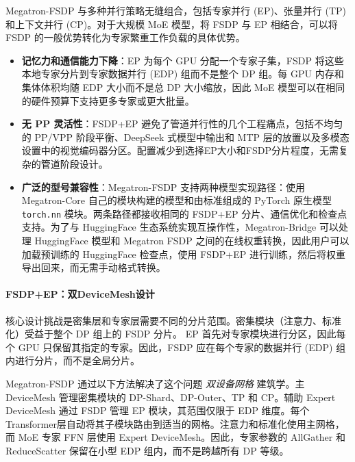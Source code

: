 \documentclass[10pt,logo,copyright]{nvidiatechreport_zh}
\begin{document}
Megatron-FSDP 与多种并行策略无缝组合，包括专家并行 (EP)、张量并行 (TP) 和上下文并行 (CP)。对于大规模 MoE 模型，将 FSDP 与 EP 相结合，可以将 FSDP 的一般优势转化为专家繁重工作负载的具体优势。

\begin{itemize}[itemsep=2pt]
  \item \textbf{记忆力和通信能力下降}：EP 为每个 GPU 分配一个专家子集，FSDP 将这些本地专家分片到专家数据并行 (EDP) 组而不是整个 DP 组。每 GPU 内存和集体体积均随 EDP 大小而不是总 DP 大小缩放，因此 MoE 模型可以在相同的硬件预算下支持更多专家或更大批量。

  \item \textbf{无 PP 灵活性}：FSDP+EP 避免了管道并行性的几个工程痛点，包括不均匀的 PP/VPP 阶段平衡、DeepSeek 式模型中输出和 MTP 层的放置以及多模态设置中的视觉编码器分区。配置减少到选择EP大小和FSDP分片程度，无需复杂的管道阶段设计。

  \item \textbf{广泛的型号兼容性}：Megatron-FSDP 支持两种模型实现路径：使用 Megatron-Core 自己的模块构建的模型和由标准组成的 PyTorch 原生模型 \texttt{torch.nn} 模块。两条路径都接收相同的 FSDP+EP 分片、通信优化和检查点支持。为了与 HuggingFace 生态系统实现互操作性，Megatron-Bridge 可以处理 HuggingFace 模型和 Megatron FSDP 之间的在线权重转换，因此用户可以加载预训练的 HuggingFace 检查点，使用 FSDP+EP 进行训练，然后将权重导出回来，而无需手动格式转换。
\end{itemize}

\paragraph{FSDP+EP：双DeviceMesh设计}

核心设计挑战是密集层和专家层需要不同的分片范围。密集模块（注意力、标准化）受益于整个 DP 组上的 FSDP 分片。 EP 首先对专家模块进行分区，因此每个 GPU 只保留其指定的专家。因此，FSDP 应在每个专家的数据并行 (EDP) 组内进行分片，而不是全局分片。

Megatron-FSDP 通过以下方法解决了这个问题 \emph{双设备网格} 建筑学。主 DeviceMesh 管理密集模块的 DP-Shard、DP-Outer、TP 和 CP。辅助 Expert DeviceMesh 通过 FSDP 管理 EP 模块，其范围仅限于 EDP 维度。每个Transformer层自动将其子模块路由到适当的网格。注意力和标准化使用主网格，而 MoE 专家 FFN 层使用 Expert DeviceMesh。因此，专家参数的 AllGather 和 ReduceScatter 保留在小型 EDP 组内，而不是跨越所有 DP 等级。

\end{document}
